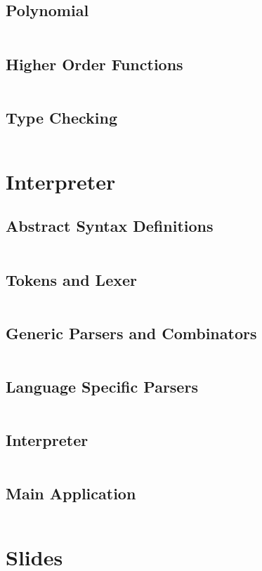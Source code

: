 \documentclass[a4paper,9pt,twoside]{book}
\newcommand{\hsfile}[1]{\inputminted[breaklines]{haskell}{../haskell/#1.hs}}
\begin{document}
\section{Polynomial}
\hsfile{exam2010/problem_2}
\section{Higher Order Functions}
\hsfile{exam2010/problem_3}
\section{Type Checking}
\hsfile{exam2010/problem_4}
\chapter{Interpreter}
\section{Abstract Syntax Definitions}
\hsfile{interpreter/AbsSyn}
\section{Tokens and Lexer}
\hsfile{interpreter/Scanner}
\section{Generic Parsers and Combinators}
\hsfile{interpreter/ParserCombis2}
\section{Language Specific Parsers}
\hsfile{interpreter/Parser2}
\section{Interpreter}
\hsfile{interpreter/Interpreter}
\section{Main Application}
\hsfile{interpreter/Main}
\chapter{Slides}
\hsfile{slides/slides}
\end{document}
